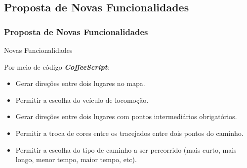  \subsection{Proposta de Novas Funcionalidades}
\begin{frame}
 \frametitle{Proposta de Novas Funcionalidades}

  \begin{block}{Novas Funcionalidades}

   Por meio de código \emph{\textbf{CoffeeScript}}:

   \begin{itemize}

    \item  Gerar direções entre dois lugares no mapa.

    \item  Permitir a escolha do veículo de locomoção.

    \item  Gerar direções entre dois lugares com pontos intermediários obrigatórios.

    \item  Permitir a troca de cores entre os tracejados entre dois pontos do caminho.

    \item  Permitir a escolha do tipo de caminho a ser percorrido
    (mais curto, mais longo, menor tempo, maior tempo, etc).

   \end{itemize}

  \end{block}

\end{frame}
